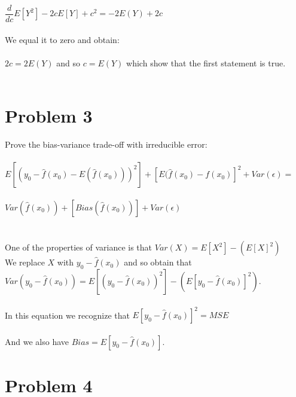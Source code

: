 \documentclass[11pt,a4paper,twoside,openright]{report}
\begin{document}
	 
	$ \dfrac{d}{dc}E[Y^2] - 2cE[Y] + c^2 = -2E(Y) + 2c $ \\\\
	
	We equal it to zero and obtain:\\\\
	
	$2c = 2E(Y)$ and so $c = E(Y)$ which show that the first statement is true. \\\\
	

	
	
	
	
	\section*{Problem 3}
	
	Prove the bias-variance trade-off with irreducible error:\\\\
	
	
	
	$E[(y_{0} - \hat{f}(x_{0}) - E(\hat{f}(x_{0})))^2] + [E(\hat{f}(x_{0}) - f(x_{0})]^2 + Var(\epsilon) =$\\\\
	
	$Var(\hat{f}(x_{0})) + [Bias(\hat{f}(x_{0}))] + Var(\epsilon)$\\
	\\\\
	
	
	One of the properties of variance is that $ Var(X) = E[X^2] - (E[X]^2) $\\
	
	
	
	We replace $X$ with $y_{0} - \hat{f}(x_{0})$ and so obtain that $Var(y_{0} - \hat{f}(x_{0})) = E[(y_{0} - \hat{f}(x_{0}))^2] - (E[y_{0} - \hat{f}(x_{0})]^2)$.\\\\
	
	In this equation we recognize that $E[y_{0} - \hat{f}(x_{0})]^2 = MSE$\\\\
	
	And we also have $Bias = E[y_{0} - \hat{f}(x_{0})]$.
	
	
	
	
	
	\section*{Problem 4}
\end{document}
